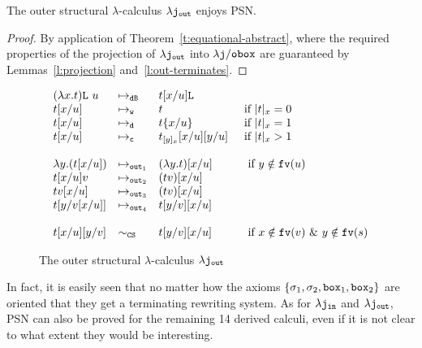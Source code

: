 \documentclass{LMCS}
\renewcommand{\>}{\rightarrow}
\def\lam{\lambda}
\def\sig{\sigma}
\newcommand{\rRew}[1]{\mapsto_{#1}}
\newcommand{\B}{{\tt dB}}
\newcommand{\dis}{{\tt j}}
\newcommand{\fv}[1]{{\tt fv}(#1)}
\newcommand{\Var}{{\tt d}}
\newcommand{\DSubs}{{\tt c}}
\newcommand{\out}{{\tt out}}
\newcommand{\iinn}{{\tt in}}
\newcommand{\ldisout}{\lam \dis_{\out}}
\newcommand{\ldisin}{\lam \dis_{\iinn}}
\newcommand{\Gc}{{\tt w}}
\newcommand{\CS}{{\tt CS}}
\newcommand{\set}[1]{ \{ #1 \}}
\newcommand{\modulo}[2]{#1/#2}
\newcommand{\ldisf}{\lam \modulo{\dis}{\fsymb}}
\newcommand{\fsymb}{\osymb\boite}
\newcommand{\osymb}{{\tt o}}
\newcommand{\List}{{\tt L}}
\newcommand{\boite}{{\tt box}}
\newcommand{\sigt}{\boite_1}
\newcommand{\sigq}{\boite_2}
\begin{document}
\begin{cor}
The outer structural $\lam$-calculus $\ldisout$ enjoys PSN.
\end{cor}

\begin{proof}
By application of Theorem~\ref{t:equational-abstract},
where the required properties 
of the projection of $\ldisout$ into $\ldisf$
are guaranteed by Lemmas~\ref{l:projection}
and~\ref{l:out-terminates}.
\end{proof}


\begin{figure}
\[\begin{array}{lll@{\hspace{.5cm}}l}
(\lam x.t)\List\ u & \rRew{\B}&  t[x/u]\List    \\
t[x/u] & \rRew{\Gc} & t &\mbox{if $|t|_x=0$}\\
t[x/u] & \rRew{\Var} & t\set{x/u} &\mbox{if $|t|_x=1$}\\
t[x/u] & \rRew{\DSubs} & t_{[y]_x}[x/u][y/u] &\mbox{if $|t|_x>1$}\\\\

\lam y. (t [x/u]) & \rRew{\out_1} & (\lam y. t) [x/u] &\mbox{ if } y\notin\fv{u} \\
t[x/u] v  & \rRew{\out_2} & (t v)[x/u] \\
t v[x/u]     & \rRew{\out_3} &  (t v)[x/u]\\
t[y/v[x/u]]    & \rRew{\out_4} &  t[y/v][x/u] &  \\\\

  
  t[x/u][y/v] & \sim_{\CS} & t[y/v][x/u] & \mbox{ if } x\notin\fv{v}\ \&\ y\notin\fv{s}
\end{array}\]
\caption{\label{fig:out-oriented-f} The outer structural $\lam$-calculus $\ldisout$}
\end{figure}

In fact, it is easily seen that no matter how the axioms $\set{\sig_1,
  \sig_2, \sigt, \sigq}$ are oriented that they get a terminating
rewriting system. As for $\ldisin$ and $\ldisout$,  
PSN can also be proved for the remaining 14
derived calculi, even if it is not clear to what extent
they  would be interesting.
\end{document}
